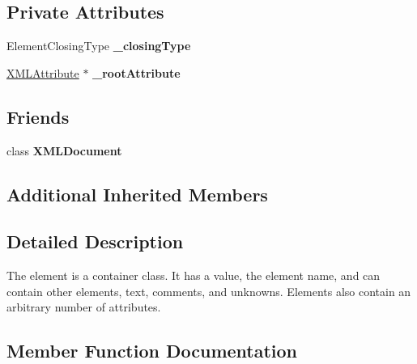 \subsection*{Private Attributes}
\begin{DoxyCompactItemize}
\item 
\mbox{\label{classtinyxml2_1_1XMLElement_a3f3f8f60bc21aae4c1bb9470d7ab0823}} 
Element\+Closing\+Type {\bfseries \+\_\+closing\+Type}
\item 
\mbox{\label{classtinyxml2_1_1XMLElement_ad067115a9f42b2df1fcdf3e0355f2789}} 
\mbox{\hyperlink{classtinyxml2_1_1XMLAttribute}{X\+M\+L\+Attribute}} $\ast$ {\bfseries \+\_\+root\+Attribute}
\end{DoxyCompactItemize}
\subsection*{Friends}
\begin{DoxyCompactItemize}
\item 
\mbox{\label{classtinyxml2_1_1XMLElement_a4eee3bda60c60a30e4e8cd4ea91c4c6e}} 
class {\bfseries X\+M\+L\+Document}
\end{DoxyCompactItemize}
\subsection*{Additional Inherited Members}


\subsection{Detailed Description}
The element is a container class. It has a value, the element name, and can contain other elements, text, comments, and unknowns. Elements also contain an arbitrary number of attributes. 

\subsection{Member Function Documentation}
\mbox{\label{classtinyxml2_1_1XMLElement_a3ea8a40e788fb9ad876c28a32932c6d5}} 
